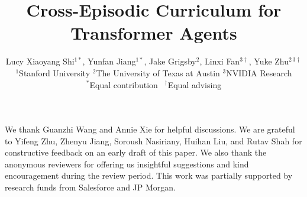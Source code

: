 \documentclass{article}
\title{Cross-Episodic Curriculum for Transformer Agents}
\author{
Lucy Xiaoyang Shi$^{1*}$, Yunfan Jiang$^{1*}$, Jake Grigsby$^2$, Linxi Fan$^{3 \dagger}$, Yuke Zhu$^{2\,3 \dagger}$\\
$^1$Stanford University \quad
$^2$The University of Texas at Austin \quad
$^3$NVIDIA Research\\
$^*$Equal contribution \, $^\dagger$Equal advising
}
\begin{document}
\maketitle


\begin{abstract}
    
\end{abstract}









\begin{ack}
We thank Guanzhi Wang and Annie Xie for helpful discussions.
We are grateful to Yifeng Zhu, Zhenyu Jiang, Soroush Nasiriany, Huihan Liu, and Rutav Shah for constructive feedback on an early draft of this paper.
We also thank the anonymous reviewers for offering us insightful suggestions and kind encouragement during the review period.
This work was partially supported by research funds from Salesforce and JP Morgan.
\end{ack}
\end{document}
